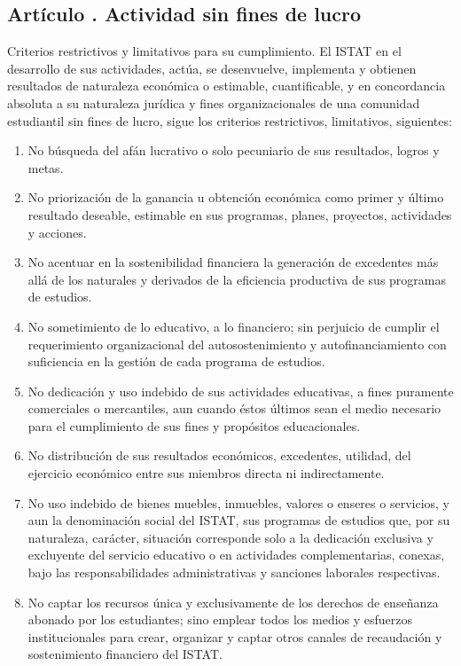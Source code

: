 \subsection{Artículo . Actividad sin fines de lucro}
\addtocounter{ns}{1}
Criterios restrictivos y limitativos para su cumplimiento. El ISTAT en el desarrollo de sus actividades, actúa, se desenvuelve, implementa y obtienen resultados de naturaleza económica o estimable, cuantificable, y en concordancia absoluta a su naturaleza jurídica y fines organizacionales de una comunidad estudiantil sin fines de lucro, sigue los criterios restrictivos, limitativos, siguientes: 
\begin{enumerate}
\item No búsqueda del afán lucrativo o solo pecuniario de sus resultados, logros y metas. 
\item No priorización de la ganancia u obtención económica como primer y último resultado deseable, estimable en sus programas, planes, proyectos, actividades y acciones. 
\item No acentuar en la sostenibilidad financiera la generación de excedentes más allá de los naturales y derivados de la eficiencia productiva de sus programas de estudios. 
\item No sometimiento de lo educativo, a lo financiero; sin perjuicio de cumplir el requerimiento organizacional del autosostenimiento y autofinanciamiento con suficiencia en la gestión de cada programa de estudios. 
\item No dedicación y uso indebido de sus actividades educativas, a fines puramente comerciales o mercantiles, aun cuando éstos últimos sean el medio necesario para el cumplimiento de sus fines y propósitos educacionales. 
\item No distribución de sus resultados económicos, excedentes, utilidad, del ejercicio económico entre sus miembros directa ni indirectamente. 
\item No uso indebido de bienes muebles, inmuebles, valores o enseres o servicios, y aun la denominación social del ISTAT, sus programas de estudios que, por su naturaleza, carácter, situación corresponde solo a la dedicación exclusiva y excluyente del servicio educativo o en actividades complementarias, conexas, bajo las responsabilidades administrativas y sanciones laborales respectivas. 
\item No captar los recursos única y exclusivamente de los derechos de enseñanza abonado por los estudiantes; sino emplear todos los medios y esfuerzos institucionales para crear, organizar y captar otros canales de recaudación y sostenimiento financiero del ISTAT. 

\end{enumerate}
